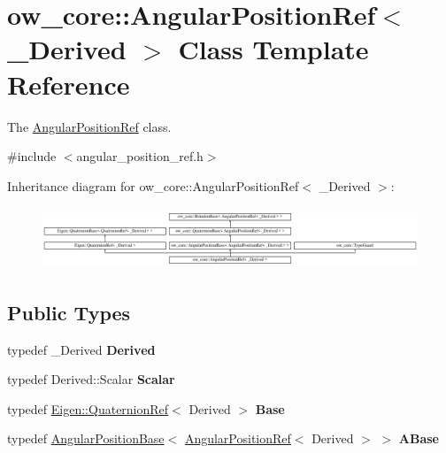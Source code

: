 \hypertarget{classow__core_1_1AngularPositionRef}{}\section{ow\+\_\+core\+:\+:Angular\+Position\+Ref$<$ \+\_\+\+Derived $>$ Class Template Reference}
\label{classow__core_1_1AngularPositionRef}


The \hyperlink{classow__core_1_1AngularPositionRef}{Angular\+Position\+Ref} class.  




{\ttfamily \#include $<$angular\+\_\+position\+\_\+ref.\+h$>$}

Inheritance diagram for ow\+\_\+core\+:\+:Angular\+Position\+Ref$<$ \+\_\+\+Derived $>$\+:\begin{figure}[H]
\begin{center}
\leavevmode
\includegraphics[height=1.866667cm]{db/d23/classow__core_1_1AngularPositionRef}
\end{center}
\end{figure}
\subsection*{Public Types}
\begin{DoxyCompactItemize}
\item 
typedef \+\_\+\+Derived {\bfseries Derived}\hypertarget{classow__core_1_1AngularPositionRef_a66f7abe85130a4a26a8fd6a566dc5423}{}\label{classow__core_1_1AngularPositionRef_a66f7abe85130a4a26a8fd6a566dc5423}

\item 
typedef Derived\+::\+Scalar {\bfseries Scalar}\hypertarget{classow__core_1_1AngularPositionRef_ab6985258d799975f5c79c91ed69a135f}{}\label{classow__core_1_1AngularPositionRef_ab6985258d799975f5c79c91ed69a135f}

\item 
typedef \hyperlink{classEigen_1_1QuaternionRef}{Eigen\+::\+Quaternion\+Ref}$<$ Derived $>$ {\bfseries Base}\hypertarget{classow__core_1_1AngularPositionRef_a0ee649184698d8b2242da564b1525c7a}{}\label{classow__core_1_1AngularPositionRef_a0ee649184698d8b2242da564b1525c7a}

\item 
typedef \hyperlink{classow__core_1_1AngularPositionBase}{Angular\+Position\+Base}$<$ \hyperlink{classow__core_1_1AngularPositionRef}{Angular\+Position\+Ref}$<$ Derived $>$ $>$ {\bfseries A\+Base}\hypertarget{classow__core_1_1AngularPositionRef_a850bb0597845e7ec2efc990ec7b13bff}{}\label{classow__core_1_1AngularPositionRef_a850bb0597845e7ec2efc990ec7b13bff}

\end{DoxyCompactItemize}

